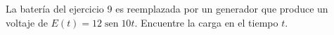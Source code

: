 \item La batería del ejercicio 9 es reemplazada por un generador que produce un voltaje de $E(t) = 12 \operatorname{sen} 10t$. Encuentre la carga en el tiempo $t$.
